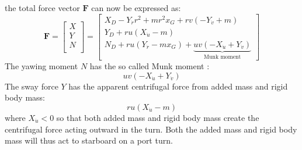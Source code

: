 the total force vector $\bm{F}$ can now be expressed as:
\begin{equation}
    \label{eq:F_expanded}
\mathbf{F} = 
\left[\begin{matrix}
X \\
Y \\
N \\
\end{matrix}\right]
=
\left[\begin{matrix}X_{D} - Y_{\dot{r}} r^{2} + m r^{2} x_{G} + r v \left(- Y_{\dot{v}} + m\right)\\Y_{D} + r u \left(X_{\dot{u}} - m\right)\\N_{D} + r u \left(Y_{\dot{r}} - m x_{G}\right) + \underbrace{u v \left(- X_{\dot{u}} + Y_{\dot{v}}\right)}_{\text{Munk moment}} \end{matrix}\right]
\end{equation}
The yawing moment $N$ has the so called Munk moment \citep{fossenHandbookMarineCraft2011}:
$$
u v \left(- X_{\dot{u}} + Y_{\dot{v}}\right)
$$
The sway force $Y$ has the apparent centrifugal force from added mass and rigid body mass: 
$$r u \left(X_{\dot{u}} - m\right)$$ where $X_{\dot{u}}<0$ so that both added mass and rigid body mass create the centrifugal force acting outward in the turn. Both the added mass and rigid body mass will thus act to starboard on a port turn.
